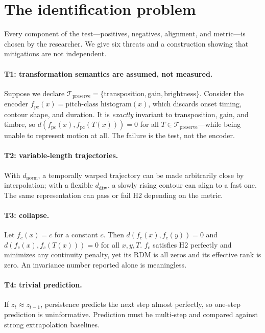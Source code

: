 \documentclass[11pt]{article}
\newcommand{\cT}{\mathcal{T}}
\begin{document}
\section{The identification problem}
\label{sec:identification}
Every component of the test---positives, negatives, alignment, and metric---is
chosen by the researcher. We give six threats and a construction showing that
mitigations are not independent.

\paragraph{T1: transformation semantics are assumed, not measured.}
Suppose we declare $\cT_{\text{preserve}}=\{\text{transposition},\text{gain},
\text{brightness}\}$. Consider the encoder
$f_{\text{pc}}(x)=\text{pitch-class histogram}(x)$, which discards onset timing,
contour shape, and duration. It is \emph{exactly} invariant to transposition,
gain, and timbre, so $d(f_{\text{pc}}(x),f_{\text{pc}}(T(x)))=0$ for all
$T\in\cT_{\text{preserve}}$---while being unable to represent motion at all. The
failure is the test, not the encoder.

\paragraph{T2: variable-length trajectories.}
With $d_{\text{norm}}$, a temporally warped trajectory can be made arbitrarily
close by interpolation; with a flexible $d_{\text{dtw}}$, a slowly rising contour
can align to a fast one. The same representation can pass or fail H2 depending on
the metric.

\paragraph{T3: collapse.}
Let $f_c(x)=c$ for a constant $c$. Then $d(f_c(x),f_c(y))=0$ and
$d(f_c(x),f_c(T(x)))=0$ for all $x,y,T$. $f_c$ satisfies H2 perfectly and
minimizes any continuity penalty, yet its RDM is all zeros and its effective rank
is zero. An invariance number reported alone is meaningless.

\paragraph{T4: trivial prediction.}
If $z_t\approx z_{t-1}$, persistence predicts the next step almost perfectly, so
one-step prediction is uninformative. Prediction must be multi-step and compared
against strong extrapolation baselines.
\end{document}
